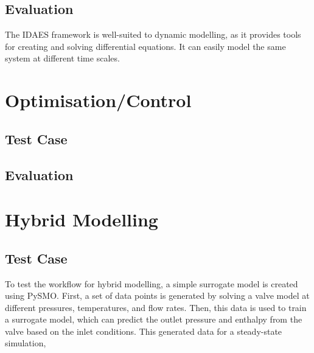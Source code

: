 \documentclass[12pt]{article}
\begin{document}
\subsection{Evaluation}
The IDAES framework is well-suited to dynamic modelling, as it provides tools for creating and solving differential equations. It can easily model the same system at different time scales.





\section{Optimisation/Control}


\subsection{Test Case}





\subsection{Evaluation}


\section{Hybrid Modelling}
\subsection{Test Case}


To test the workflow for hybrid modelling, a simple surrogate model is created using PySMO. First, a set of data points is generated by solving a valve model at different pressures, temperatures, and flow rates. Then, this data is used to train a surrogate model, which can predict the outlet pressure and enthalpy from the valve based on the inlet conditions. This generated data for a steady-state simulation, 
\end{document}
